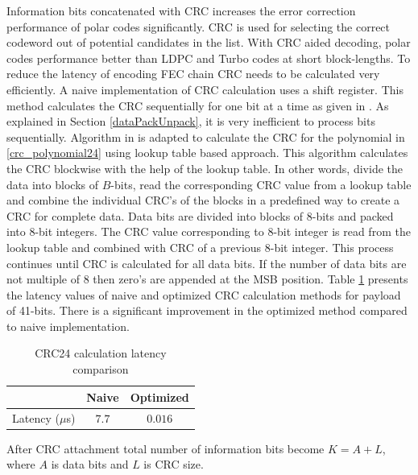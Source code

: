Information bits concatenated with CRC increases the error correction performance of polar codes significantly. CRC is used for selecting the correct codeword out of potential candidates in the list. With CRC aided decoding, polar codes performance better than LDPC and Turbo codes at short block-lengths. To reduce the latency of encoding FEC chain CRC needs to be calculated very efficiently. A naive implementation of CRC calculation uses a shift register. This method calculates the CRC sequentially for one bit at a time as given in \cite{naiveCRCCalculation}. As explained in Section \ref{dataPackUnpack}, it is very inefficient to process bits sequentially. Algorithm in \cite{Sarwate:1988:CCR:63030.63037} is adapted to calculate the CRC for the polynomial in \eqref{crc_polynomial24} using lookup table based approach. This algorithm calculates the CRC blockwise with the help of the lookup table. In other words, divide the data into blocks of $B$-bits, read the corresponding CRC value from a lookup table and combine the individual CRC's of the blocks in a predefined way to create a CRC for complete data. Data bits are divided into blocks of 8-bits and packed into 8-bit integers. The CRC value corresponding to 8-bit integer is read from the lookup table and combined with CRC of a previous 8-bit integer. This process continues until CRC is calculated for all data bits. If the number of data bits are not multiple of 8 then zero's are appended at the MSB position.  Table \ref{tab:crcLatencyTable} presents the latency values of naive and optimized  CRC calculation methods for payload of 41-bits. There is a significant improvement in the optimized method compared to naive implementation.

\begin{table}[h!]
	\begin{center}
		\caption{CRC24 calculation latency comparison}
		\label{tab:crcLatencyTable}
		\begin{tabular}{c|c|c} %
			\textbf{ } & Naive & Optimized \\
			\hline
			Latency ($\mu$s) & $7.7$ & $0.016$\\
		\end{tabular}
	\end{center}
\end{table}

After CRC attachment total number of information bits become $K = A + L$, where $ A $ is data bits and $ L $ is CRC size.

